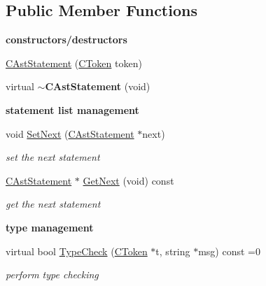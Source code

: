\subsection*{Public Member Functions}
\begin{Indent}{\bf constructors/destructors}\par
\begin{DoxyCompactItemize}
\item 
\hyperlink{classCAstStatement_ab5ca8d71ef8f7a6cdc6835ba12d159e2}{C\-Ast\-Statement} (\hyperlink{classCToken}{C\-Token} token)
\item 
\hypertarget{classCAstStatement_af6e9bb90c0f5f67c2bd8f419d264069e}{virtual {\bfseries $\sim$\-C\-Ast\-Statement} (void)}\label{classCAstStatement_af6e9bb90c0f5f67c2bd8f419d264069e}

\end{DoxyCompactItemize}
\end{Indent}
\begin{Indent}{\bf statement list management}\par
\begin{DoxyCompactItemize}
\item 
\hypertarget{classCAstStatement_aeecd18f9129e4798c241d15125a09728}{void \hyperlink{classCAstStatement_aeecd18f9129e4798c241d15125a09728}{Set\-Next} (\hyperlink{classCAstStatement}{C\-Ast\-Statement} $\ast$next)}\label{classCAstStatement_aeecd18f9129e4798c241d15125a09728}

\begin{DoxyCompactList}\small\item\em set the next {\itshape statement} \end{DoxyCompactList}\item 
\hypertarget{classCAstStatement_a15767f00212caa3879fa4e9fc2b3ffc2}{\hyperlink{classCAstStatement}{C\-Ast\-Statement} $\ast$ \hyperlink{classCAstStatement_a15767f00212caa3879fa4e9fc2b3ffc2}{Get\-Next} (void) const }\label{classCAstStatement_a15767f00212caa3879fa4e9fc2b3ffc2}

\begin{DoxyCompactList}\small\item\em get the next {\itshape statement} \end{DoxyCompactList}\end{DoxyCompactItemize}
\end{Indent}
\begin{Indent}{\bf type management}\par
\begin{DoxyCompactItemize}
\item 
virtual bool \hyperlink{classCAstStatement_af4e22fa71fa3b1fe73bb361a0fc4ec8b}{Type\-Check} (\hyperlink{classCToken}{C\-Token} $\ast$t, string $\ast$msg) const =0
\begin{DoxyCompactList}\small\item\em perform type checking \end{DoxyCompactList}\end{DoxyCompactItemize}
\end{Indent}
